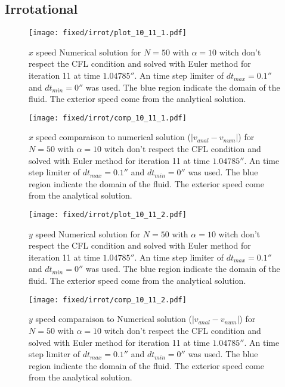 \clearpage 
\subsection{Irrotational}

\begin{figure}
\texttt{[image: fixed/irrot/plot\_10\_11\_1.pdf]}
\caption{$x$ speed Numerical solution for $N=50$ with $\alpha=10$ witch don't respect the CFL condition and solved with Euler method
for iteration 11 at time $\unit{1.04785}{\second}$.
An time step limiter of $dt_{max}=\unit{0.1}{\second}$ and $dt_{min}=\unit{0}{\second}$ was used.
The blue region indicate the domain of the fluid. The exterior speed come from the analytical solution.
\label{fix:plot_10_11_1}
}
\end{figure}

\begin{figure}
\texttt{[image: fixed/irrot/comp\_10\_11\_1.pdf]}
\caption{$x$ speed comparaison to numerical solution ($|v_{anal}-v_{num}|$) for $N=50$ with $\alpha=10$ witch don't respect the CFL condition and solved with Euler method
for iteration 11 at time $\unit{1.04785}{\second}$.
An time step limiter of $dt_{max}=\unit{0.1}{\second}$ and $dt_{min}=\unit{0}{\second}$ was used.
The blue region indicate the domain of the fluid. The exterior speed come from the analytical solution.
\label{fix:comp_10_11_1}
}
\end{figure}

\begin{figure}
\texttt{[image: fixed/irrot/plot\_10\_11\_2.pdf]}
\caption{$y$ speed Numerical solution for $N=50$ with $\alpha=10$ witch don't respect the CFL condition and solved with Euler method
for iteration 11 at time $\unit{1.04785}{\second}$.
An time step limiter of $dt_{max}=\unit{0.1}{\second}$ and $dt_{min}=\unit{0}{\second}$ was used.
The blue region indicate the domain of the fluid. The exterior speed come from the analytical solution.
\label{fix:plot_10_11_2}
}
\end{figure}

\begin{figure}
\texttt{[image: fixed/irrot/comp\_10\_11\_2.pdf]}
\caption{$y$ speed comparaison to Numerical solution ($|v_{anal}-v_{num}|$) for $N=50$ with $\alpha=10$ witch don't respect the CFL condition and solved with Euler method
for iteration 11 at time $\unit{1.04785}{\second}$.
An time step limiter of $dt_{max}=\unit{0.1}{\second}$ and $dt_{min}=\unit{0}{\second}$ was used.
The blue region indicate the domain of the fluid. The exterior speed come from the analytical solution.
\label{fix:comp_10_11_2}
}
\end{figure}

